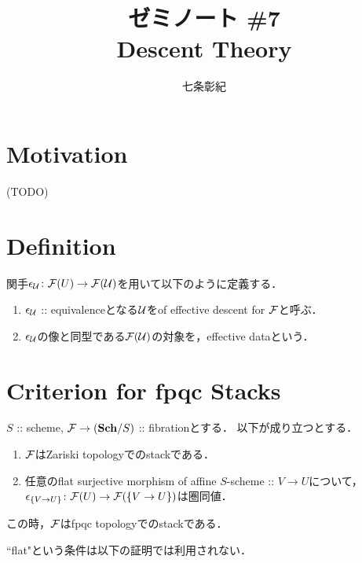 \documentclass[a4paper, dvipdfmx]{jsarticle}
\begin{document}
\title{ゼミノート \#7 \\ Descent Theory}
\author{七条彰紀}
\maketitle

\newcommand{\QCoh}{\mathbf{QCoh}}
\newcommand{\Mod}{\mathbf{Mod}}
\newcommand{\vsim}{\text{\rotatebox{-90}{$\sim$}}}

\section{Motivation}
    (TODO)

\section{Definition}
\begin{Def}
    関手$\epsilon_{\mathcal{U}} \colon \mathcal{F}(U) \to \mathcal{F}(\mathcal{U})$を用いて以下のように定義する．
    \begin{enumerate}[label=(\roman*)]
        \item
            $\epsilon_{\mathcal{U}}$ :: equivalenceとなる$\mathcal{U}$をof effective descent for $\mathcal{F}$と呼ぶ．
        \item
            $\epsilon_{\mathcal{U}}$の像と同型である$\mathcal{F}(\mathcal{U})$の対象を，effective dataという．
    \end{enumerate}
\end{Def}

\section{Criterion for fpqc Stacks}
\begin{Lemma}
    $S$ :: scheme,
    $\mathcal{F} \to (\mathbf{Sch}/S)$ :: fibrationとする．
    以下が成り立つとする．
    \begin{enumerate}[label=(\alph*)]
        \item $\mathcal{F}$はZariski topologyでのstackである．
        \item
            任意のflat surjective morphism of affine $S$-scheme :: $V \to U$について，\mnewline
            $\epsilon_{\{V \to U\}} \colon \mathcal{F}(U) \to \mathcal{F}(\{V \to U\})$は圏同値．
    \end{enumerate}
    この時，$\mathcal{F}$はfpqc topologyでのstackである．
\end{Lemma}

\begin{Remark}
    ``flat"という条件は以下の証明では利用されない．
\end{Remark}
\end{document}
